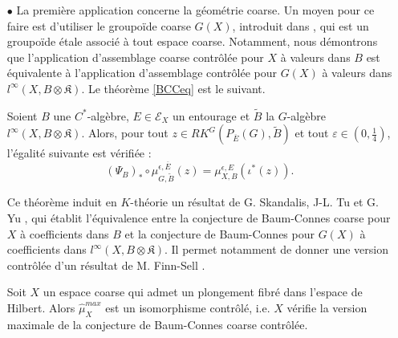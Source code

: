 \begin{itemize}

\item[$\bullet$] La première application concerne la géométrie coarse. Un moyen pour ce faire est d'utiliser le groupoïde coarse $G(X)$, introduit dans \cite{SkTuYu}, qui est un groupoïde étale associé à tout espace coarse. Notamment, nous démontrons que l'application d'assemblage coarse contrôlée pour $X$ à valeurs dans $B$ est équivalente à l'application d'assemblage contrôlée pour $G(X)$ à valeurs dans $l^\infty(X,B\otimes\mathfrak K)$. Le théorème \ref{BCCeq} est le suivant.\\

\begin{thmfr}
Soient $B$ une $C^*$-algèbre, $E\in\mathcal E_X$ un entourage et $\tilde B$ la $G$-algèbre $l^\infty(X,B\otimes \mathfrak K)$. Alors, pour tout $z\in RK^G(P_{\overline E}(G),\tilde B)$ et tout $\varepsilon\in(0,\frac{1}{4})$, l'égalité suivante est vérifiée :
\[(\Psi_B)_*\circ\mu^{\epsilon,\overline E}_{G,\tilde B} (z) = \mu_{X,B}^{\epsilon,E}(\iota^*(z)).\]
\end{thmfr}

Ce théorème induit en $K$-théorie un résultat de G. Skandalis, J-L. Tu et G. Yu \cite{SkTuYu}, qui établit l'équivalence entre la conjecture de Baum-Connes coarse pour $X$ à coefficients dans $B$ et la conjecture de Baum-Connes pour $G(X)$ à coefficients dans $l^\infty(X,B\otimes \mathfrak K)$. Il permet notamment de donner une version contrôlée d'un résultat de M. Finn-Sell \cite{FinnSellFibred}. \\

\begin{corfr}
Soit $X$ un espace coarse qui admet un plongement fibré dans l'espace de Hilbert. Alors $\hat \mu_{X}^{max}$ est un isomorphisme contrôlé, i.e. $X$ vérifie la version maximale de la conjecture de Baum-Connes coarse contrôlée.\\
\end{corfr}


\end{itemize}

